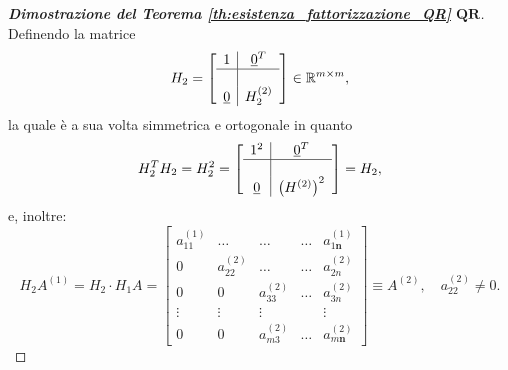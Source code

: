 \begin{proof}[\textbf{Dimostrazione del Teorema \ref{th:esistenza_fattorizzazione_QR}} $\boldsymbol{QR}$]
    Definendo la matrice
    \begin{equation*}
        H_2 = 
        \left[\begin{array}{c|c}
            1 & \uline 0^T \\
            \hline\\
            \uline 0 & H_2^{(2)}
        \end{array}\right]\in\mathbb R^{m\times m},
    \end{equation*}
    la quale è a sua volta simmetrica e ortogonale in quanto
    \begin{equation*}
        H_2^TH_2=H_2^2=
        \left[\begin{array}{c|c}
            1^2 & \uline 0^T \\
            \hline\\
            \uline 0 & \left(H^{(2)}\right)^2
        \end{array}\right] = H_2,
    \end{equation*}
    e, inoltre:
    \begin{equation*}
        H_2A^{(1)} = H_2\cdot H_1 A =
        \begin{bmatrix}
            a_{11}^{(1)} &\hdots & \hdots & \hdots & a_{1\boldsymbol n}^{(1)}\\
            0 & a_{22}^{(2)} & \hdots & \hdots & a_{2n}^{(2)}\\
            0 & 0 & a_{33}^{(2)} & \hdots & a_{3n}^{(2)}\\
            \vdots & \vdots & \vdots & & \vdots\\
            0 & 0 & a_{m3}^{(2)} & \hdots & a_{m\boldsymbol n}^{(2)}
        \end{bmatrix}\equiv A^{(2)}, \quad a_{22}^{(2)}\neq 0.
    \end{equation*}
    

\end{proof}
